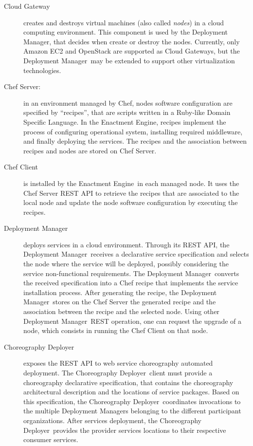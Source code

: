 \documentclass[a4paper, 10pt]{article}
\newcommand{\ee}{Enactment Engine}
\newcommand{\cd}{Choreography Deployer}
\newcommand{\dm}{Deployment Manager}
\begin{document}
\begin{description}

\item [Cloud Gateway] creates and destroys virtual machines (also called \emph{nodes}) in a cloud computing environment. This component is used by the \dm, that decides when create or destroy the nodes. Currently, only Amazon EC2 and OpenStack are supported as Cloud Gateways, but the \dm\ may be extended to support other virtualization technologies.

\item [Chef Server:] in an environment managed by Chef, nodes software configuration are specified by ``recipes'', that are scripts written in a Ruby-like Domain Specific Language. In the \ee, recipes implement the process of configuring operational system, installing required middleware, and finally deploying the services. The recipes and the association between recipes and nodes are stored on Chef Server.

\item[Chef Client] is installed by the \ee\ in each managed node. It uses the Chef Server REST API to retrieve the recipes that are associated to the local node and update the node software configuration by executing the recipes. 

\item [\dm] deploys services in a cloud environment. Through its REST API, the \dm\ receives a declarative service specification and selects the node where the service will be deployed, possibly considering the service non-functional requirements. The \dm\ converts the received specification into a Chef recipe that implements the service installation process. After generating the recipe, the \dm\ stores on the Chef Server the generated recipe and the association between the recipe and the selected node. Using other \dm\ REST operation, one can request the upgrade of a node, which consists in running the Chef Client on that node.

\item [\cd] exposes the REST API to web service choreography automated deployment. The \cd\ client must provide a choreography declarative specification, that contains the choreography architectural description and the locations of service packages. Based on this specification, the \cd\ coordinates invocations to the multiple \dm{s} belonging to the different participant organizations. After services deployment, the \cd\ provides the provider services locations to their respective consumer services.

\end{description} 
\end{document}
